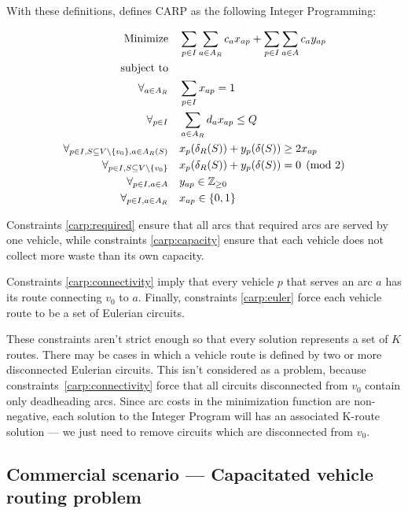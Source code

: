 With these definitions, \citet{Belenguer98} defines CARP as the following
Integer Programming:

\begin{align}
	\mbox{Minimize} & \quad \sum_{p \in I} \sum_{a \in A_R} c_a x_{ap} +
	\sum_{p \in I} \sum_{a \in A} c_{a} y_{ap}
	\\
	\mbox{subject to} &  \notag{} \\
	\forall_{a \in A_R} & \quad \sum_{p \in I} x_{ap} = 1
	\label{carp:required}
	\\
	\forall_{p \in I} & \quad \sum_{a \in A_R} d_a x_{ap} \leq Q
	\label{carp:capacity}
	\\
	\forall_{p \in I, S \subseteq V \setminus \{v_0\}, a \in A_R(S)} &
	\quad x_p(\delta_R(S)) + y_p(\delta(S)) \geq 2x_{ap}
	\label{carp:connectivity}
	\\
	\forall_{p \in I, S \subseteq V \setminus \{v_0\}} & \quad
	x_p(\delta_R(S)) + y_p(\delta(S)) = 0 \pmod{2}
	\label{carp:euler}
	\\
	\forall_{p \in I, a \in A} & \quad y_{ap} \in \mathbb{Z}_{\geq0} \\
	\forall_{p \in I, a \in A_R} & \quad x_{ap} \in \{0, 1\}
\end{align}

Constraints \eqref{carp:required} ensure that all arcs that required arcs are
served by one vehicle, while constraints \eqref{carp:capacity} ensure that each
vehicle does not collect more waste than its own capacity.

Constraints \eqref{carp:connectivity} imply that every vehicle $p$ that serves
an arc $a$ has its route connecting $v_0$ to $a$. Finally, constraints
\eqref{carp:euler} force each vehicle route to be a set of Eulerian circuits.

These constraints aren't strict enough so that every solution represents a set
of $K$ routes. There may be cases in which a vehicle route is defined by two or
more disconnected Eulerian circuits. This isn't considered as a problem,
because constraints~\eqref{carp:connectivity} force that all circuits
disconnected from $v_0$ contain only deadheading arcs. Since arc costs in the
minimization function are non-negative, each solution to the Integer Program
will has an associated K-route solution --- we just need to remove circuits
which are disconnected from $v_0$.

\subsection{Commercial scenario --- Capacitated vehicle routing problem}

